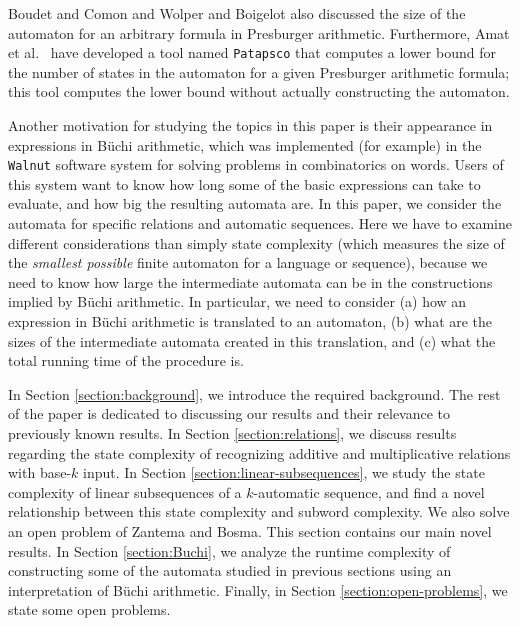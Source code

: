 \documentclass[12pt,reqno]{article}
\begin{document}
Boudet and Comon \cite{boudet_diophantine_1996} and Wolper and Boigelot \cite{wolper_construction_2000} also discussed the size of the automaton for an arbitrary formula in Presburger arithmetic.
Furthermore, Amat et al.~\cite{amat_how_nodate} have developed a tool named {\tt Patapsco} that computes a lower bound for the number of states in the automaton for a given Presburger arithmetic formula; this tool computes the lower bound without actually constructing the automaton.
 
Another motivation for studying the topics in this paper is their appearance in expressions in B\"uchi arithmetic, which was implemented (for example) in the \texttt{Walnut} software system \cite{mousavi_automatic_2021} for solving problems in combinatorics on words. 
 Users of this system want to know how long some of the basic expressions can take to evaluate, and how big the resulting automata are. In this paper, we consider the automata for specific relations and automatic sequences. Here we have to examine different considerations than simply state complexity (which measures the size of the {\it smallest possible\/} finite automaton for a language or sequence), because we need to know how large the intermediate automata can be in the constructions implied by B\"uchi arithmetic.   In particular, we need to consider (a) how an expression in B\"uchi arithmetic is translated to an automaton, (b) what are the sizes of the intermediate automata created in this translation, and (c) what the total running time of the procedure is.

In Section \ref{section:background}, we introduce the required background. The rest of the paper is dedicated to discussing our results and their relevance to previously known results. In Section \ref{section:relations}, we discuss results regarding the state complexity of recognizing additive and multiplicative relations with base-$k$ input.
In Section \ref{section:linear-subsequences}, we study the state complexity of linear subsequences of a $k$-automatic sequence, and find a novel relationship between this state complexity and subword complexity.  We also solve an open problem of Zantema and Bosma.   This section contains our main novel results.
In Section \ref{section:Buchi}, we analyze the runtime complexity of constructing some of the automata studied in previous sections using an interpretation of B\"uchi arithmetic. Finally, in Section \ref{section:open-problems}, we state some open problems.
\end{document}
